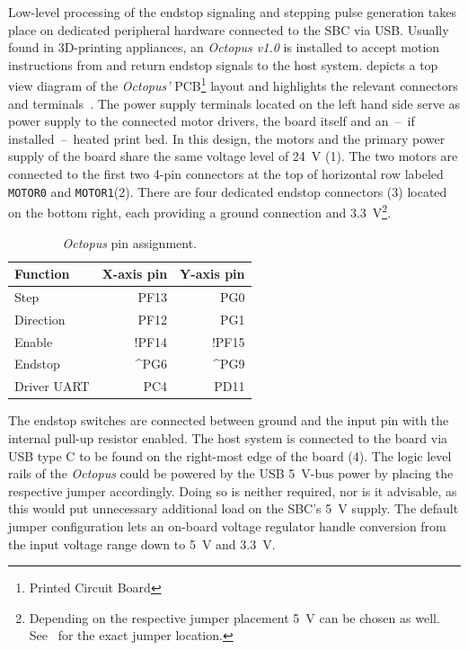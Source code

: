             Low-level processing of the endstop signaling and stepping pulse generation takes place on dedicated peripheral hardware connected to the SBC via USB.
            Usually found in 3D-printing appliances, an \textit{Octopus v1.0} is installed to accept motion instructions from and return endstop signals to the host system.
             depicts a top view diagram of the \textit{Octopus'} PCB\footnote{Printed Circuit Board} layout and highlights the relevant connectors and terminals~\cite{Manual.BigTreeTechOctopus}.
            The power supply terminals located on the left hand side serve as power supply to the connected motor drivers, the board itself and an~--~if installed~--~heated print bed.
            In this design, the motors and the primary power supply of the board share the same voltage level of \qty{24}{\volt} (1).
            The two motors are connected to the first two 4-pin connectors at the top of horizontal row labeled \texttt{MOTOR0} and \texttt{MOTOR1}(2).
            There are four dedicated endstop connectors (3) located on the bottom right, each providing a ground connection and \qty{3.3}{\volt}\footnote{Depending on the respective jumper placement \qty{5}{\volt} can be chosen as well. See~\cite{Manual.BigTreeTechOctopus} for the exact jumper location.}.

            \begin{table}[h]
                \centering
                \caption[\textit{Octopus} pin assignment]{\textit{Octopus} pin assignment.}
                \label{tab:octopus pin assignments}
                \begin{tabular}{@{}lrr@{}}
                    \toprule
                    Function&   X-axis pin& Y-axis pin\\
                    \midrule
                    Step&       PF13&   PG0\\
                    Direction&  PF12&   PG1\\
                    Enable&     !PF14&  !PF15\\
                    Endstop&    \textasciicircum PG6&   \textasciicircum PG9\\
                    Driver UART& PC4&   PD11\\
                    \bottomrule
                \end{tabular}
            \end{table}

            The endstop switches are connected between ground and the input pin with the internal pull-up resistor enabled.
            The host system is connected to the board via USB type C to be found on the right-most edge of the board (4).
            The logic level rails of the \textit{Octopus} could be powered by the USB \qty{5}{\volt}-bus power by placing the respective jumper accordingly.
            Doing so is neither required, nor is it advisable, as this would put unnecessary additional load on the SBC's \qty{5}{\volt} supply.
            The default jumper configuration lets an on-board voltage regulator handle conversion from the input voltage range down to \qty{5}{\volt} and \qty{3.3}{\volt}.

